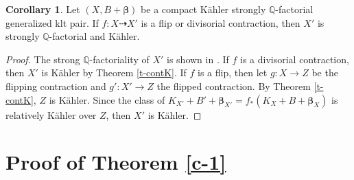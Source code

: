 \documentclass[11pt]{amsart}
\numberwithin{equation}{section}
\def\bbeta{\boldsymbol{\beta}}
\newcommand\Q{{\mathbb{Q}}}
\theoremstyle{definition}
\theoremstyle{definition}
\newtheorem{theorem}{Theorem}[section]
\newtheorem{corollary}[theorem]{Corollary}
\theoremstyle{definition}
\begin{document}
\begin{corollary}\label{c-kahlermmp} Let $(X,B+\bbeta)$ be a compact K\"ahler strongly $\Q$-factorial generalized klt pair. If $f:X\dasharrow X'$ is a flip or divisorial contraction, then $X'$ is strongly $\Q$-factorial and K\"ahler. \end{corollary}
\begin{proof} The strong $\Q$-factoriality of $X'$ is shown in \cite[Lemma 2.5]{DH25}. If $f$ is a divisorial contraction, then $X'$ is K\"ahler by Theorem \ref{t-contK}. If $f$ is a flip, then let $g:X\to Z$ be the flipping contraction and $g':X'\to Z$ the flipped contraction. By Theorem \ref{t-contK}, $Z$ is K\"ahler. Since the class of $K_{X'}+B'+\bbeta _{X'}=f_*(K_X+B+\bbeta _X)$ is relatively K\"ahler over $Z$, then $X'$ is K\"ahler.
\end{proof}


\section{Proof of Theorem \ref{c-1}}%
\end{document}
